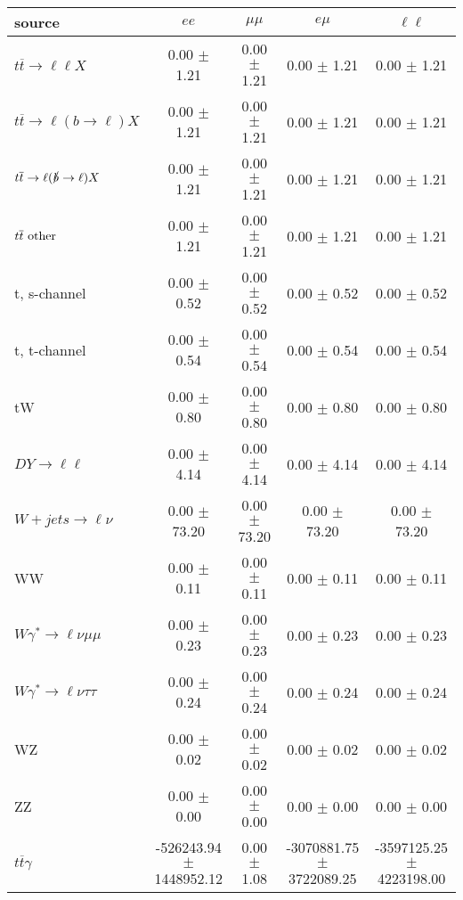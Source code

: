 \begin{tabular}{l|cccc} \hline\hline
source & $ee$ & $\mu\mu$ & $e\mu$ & $\ell\ell $ \\
\hline
$t\overline{t} \rightarrow \ell \ell X$ &  0.00 $\pm$  1.21 &  0.00 $\pm$  1.21 &  0.00 $\pm$  1.21 &  0.00 $\pm$  1.21 \\
$t\overline{t} \rightarrow \ell (b \rightarrow \ell) X$ &  0.00 $\pm$  1.21 &  0.00 $\pm$  1.21 &  0.00 $\pm$  1.21 &  0.00 $\pm$  1.21 \\
$t\overline{t} \rightarrow \ell (\slashed b \rightarrow \ell) X$ &  0.00 $\pm$  1.21 &  0.00 $\pm$  1.21 &  0.00 $\pm$  1.21 &  0.00 $\pm$  1.21 \\
        $t\overline{t}\ \rm{other}$ &  0.00 $\pm$  1.21 &  0.00 $\pm$  1.21 &  0.00 $\pm$  1.21 &  0.00 $\pm$  1.21 \\
\hline
                       t, s-channel &  0.00 $\pm$  0.52 &  0.00 $\pm$  0.52 &  0.00 $\pm$  0.52 &  0.00 $\pm$  0.52 \\
                       t, t-channel &  0.00 $\pm$  0.54 &  0.00 $\pm$  0.54 &  0.00 $\pm$  0.54 &  0.00 $\pm$  0.54 \\
                                 tW &  0.00 $\pm$  0.80 &  0.00 $\pm$  0.80 &  0.00 $\pm$  0.80 &  0.00 $\pm$  0.80 \\
\hline
         $DY \rightarrow \ell \ell$ &  0.00 $\pm$  4.14 &  0.00 $\pm$  4.14 &  0.00 $\pm$  4.14 &  0.00 $\pm$  4.14 \\
      $W+jets \rightarrow \ell \nu$ &  0.00 $\pm$ 73.20 &  0.00 $\pm$ 73.20 &  0.00 $\pm$ 73.20 &  0.00 $\pm$ 73.20 \\
                                 WW &  0.00 $\pm$  0.11 &  0.00 $\pm$  0.11 &  0.00 $\pm$  0.11 &  0.00 $\pm$  0.11 \\
\hline
$W\gamma^{*} \rightarrow \ell \nu \mu\mu$ &  0.00 $\pm$  0.23 &  0.00 $\pm$  0.23 &  0.00 $\pm$  0.23 &  0.00 $\pm$  0.23 \\
$W\gamma^{*} \rightarrow \ell \nu \tau\tau$ &  0.00 $\pm$  0.24 &  0.00 $\pm$  0.24 &  0.00 $\pm$  0.24 &  0.00 $\pm$  0.24 \\
                                 WZ &  0.00 $\pm$  0.02 &  0.00 $\pm$  0.02 &  0.00 $\pm$  0.02 &  0.00 $\pm$  0.02 \\
                                 ZZ &  0.00 $\pm$  0.00 &  0.00 $\pm$  0.00 &  0.00 $\pm$  0.00 &  0.00 $\pm$  0.00 \\
\hline
              $t\overline{t}\gamma$ & -526243.94 $\pm$ 1448952.12 &  0.00 $\pm$  1.08 & -3070881.75 $\pm$ 3722089.25 & -3597125.25 $\pm$ 4223198.00 \\

\end{tabular}
